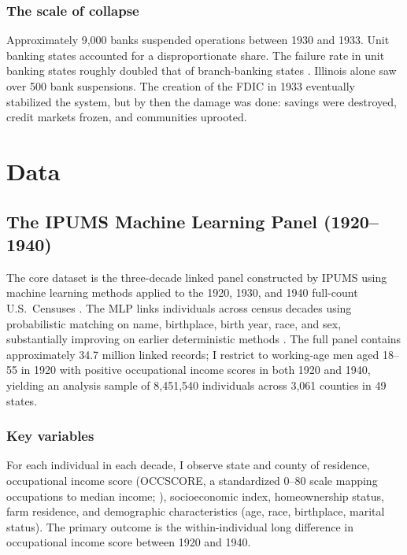 \documentclass[12pt]{article}
\begin{document}
\subsubsection*{The scale of collapse}
Approximately 9,000 banks suspended operations between 1930 and 1933. Unit banking states accounted for a disproportionate share. The failure rate in unit banking states roughly doubled that of branch-banking states \citep{wheelock1995, mitchener2005}. Illinois alone saw over 500 bank suspensions. The creation of the FDIC in 1933 eventually stabilized the system, but by then the damage was done: savings were destroyed, credit markets frozen, and communities uprooted.


\section{Data}
\label{sec:data}

\subsection{The IPUMS Machine Learning Panel (1920--1940)}

The core dataset is the three-decade linked panel constructed by IPUMS using machine learning methods applied to the 1920, 1930, and 1940 full-count U.S.\ Censuses \citep{helgertz2023}. The MLP links individuals across census decades using probabilistic matching on name, birthplace, birth year, race, and sex, substantially improving on earlier deterministic methods \citep{abramitzky2021, feigenbaum2018}. The full panel contains approximately 34.7 million linked records; I restrict to working-age men aged 18--55 in 1920 with positive occupational income scores in both 1920 and 1940, yielding an analysis sample of 8,451,540 individuals across 3,061 counties in 49 states.

\subsubsection*{Key variables}
For each individual in each decade, I observe state and county of residence, occupational income score (OCCSCORE, a standardized 0--80 scale mapping occupations to median income; \citet{long2009}), socioeconomic index, homeownership status, farm residence, and demographic characteristics (age, race, birthplace, marital status). The primary outcome is the within-individual long difference in occupational income score between 1920 and 1940.
\end{document}
